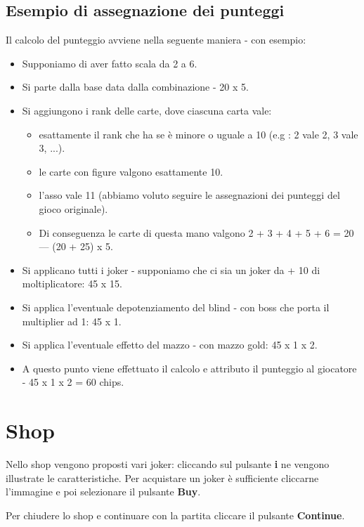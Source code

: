 \documentclass[a4paper,12pt]{report}
\begin{document}
\subsection{Esempio di assegnazione dei punteggi}
Il calcolo del punteggio avviene nella seguente maniera - con esempio:
\begin{itemize}
	\item Supponiamo di aver fatto scala da 2 a 6.
	\item Si parte dalla base data dalla combinazione - 20 x 5.
	\item Si aggiungono i rank delle carte, dove ciascuna carta vale:
	\begin{itemize}
		\item esattamente il rank che ha se è minore o uguale a 10 (e.g : 2 vale 2, 3 vale 3, ...).
		\item le carte con figure valgono esattamente 10.
		\item l'asso vale 11 (abbiamo voluto seguire le assegnazioni dei punteggi del gioco originale).
		\item Di conseguenza le carte di questa mano valgono 2 + 3 + 4 + 5 + 6 = 20 --- (20 + 25) x 5.
	\end{itemize}
	\item Si applicano tutti i joker - supponiamo che ci sia un joker da + 10 di moltiplicatore: 45 x 15.
	\item Si applica l'eventuale depotenziamento del blind - con boss che porta il multiplier ad 1: 45 x 1.
	\item Si applica l'eventuale effetto del mazzo - con mazzo gold: 45 x 1 x 2.
	\item A questo punto viene effettuato il calcolo e attributo il punteggio al giocatore - 45 x 1 x 2 = 60 chips.
\end{itemize}



\section{Shop}

Nello shop vengono proposti vari joker: cliccando sul pulsante \textbf{i} ne vengono illustrate le caratteristiche.
Per acquistare un joker è sufficiente cliccarne l'immagine e poi selezionare il pulsante \textbf{Buy}.

Per chiudere lo shop e continuare con la partita cliccare il pulsante \textbf{Continue}.
\end{document}
